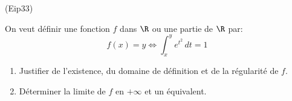 \begin{tiny}(Eip33)\end{tiny} On veut définir une fonction $f$ dans $\R$ ou une partie de $\R$ par:
\[
 f(x) = y \Leftrightarrow \int_x^y e^{t^2}\, dt = 1
\]
\begin{enumerate}
 \item Justifier de l'existence, du domaine de définition et de la régularité de $f$.
 \item Déterminer la limite de $f$ en $+\infty$ et un équivalent.
\end{enumerate}
